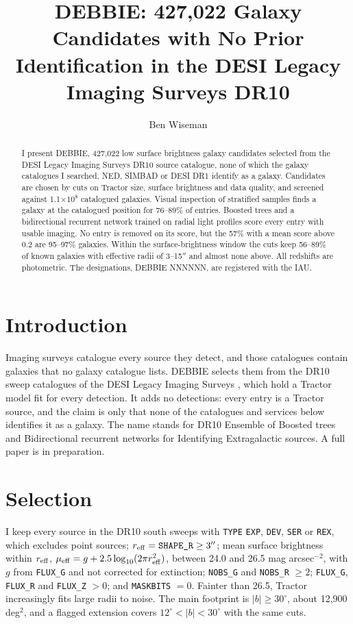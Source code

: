 \documentclass{aastex701}
\begin{document}
\title{DEBBIE: 427,022 Galaxy Candidates with No Prior Identification in the DESI Legacy Imaging Surveys DR10}

\author{Ben Wiseman}

\begin{abstract}
I present DEBBIE, 427,022 low surface brightness galaxy candidates selected from
the DESI Legacy Imaging Surveys DR10 source catalogue, none of which the galaxy
catalogues I searched, NED, SIMBAD or DESI DR1 identify as a galaxy. Candidates are chosen
by cuts on Tractor size, surface brightness and data quality, and screened
against 1.1$\times10^{8}$ catalogued galaxies. Visual inspection of
stratified samples finds a galaxy at the catalogued position for
76--89\% of entries. Boosted trees and a bidirectional recurrent
network trained on radial light profiles score every entry with usable imaging.
No entry is removed on its score, but the 57\% with a mean score above 0.2 are
95--97\% galaxies. Within the surface-brightness window the
cuts keep 56--89\% of known galaxies with effective radii of
3--15$''$ and almost none above. All redshifts are photometric. The
designations, DEBBIE NNNNNN, are registered with the IAU.
\end{abstract}

\section{Introduction}

Imaging surveys catalogue every source they detect, and those catalogues
contain galaxies that no galaxy catalogue lists. DEBBIE selects them from the
DR10 sweep catalogues of the DESI Legacy Imaging Surveys \citep{dey2019}, which
hold a Tractor model fit \citep{lang2016} for every detection. It adds no
detections: every entry is a Tractor source, and the claim is only that none of
the catalogues and services below identifies it as a galaxy. The name
stands for DR10 Ensemble of Boosted trees and Bidirectional recurrent networks
for Identifying Extragalactic sources. A full paper is in preparation.

\section{Selection}

I keep every source in the DR10 south sweeps with \texttt{TYPE} \texttt{EXP},
\texttt{DEV}, \texttt{SER} or \texttt{REX}, which excludes point sources;
$r_{\rm eff} = \texttt{SHAPE\_R} \ge 3''$; mean surface brightness within
$r_{\rm eff}$, $\mu_{\rm eff} = g + 2.5\log_{10}(2\pi r_{\rm eff}^2)$, between
24.0 and 26.5 mag arcsec$^{-2}$, with $g$ from \texttt{FLUX\_G} and not corrected
for extinction; \texttt{NOBS\_G} and \texttt{NOBS\_R} $\ge 2$; \texttt{FLUX\_G},
\texttt{FLUX\_R} and \texttt{FLUX\_Z} $> 0$; and \texttt{MASKBITS} $= 0$. Fainter
than 26.5, Tractor increasingly fits large radii to noise. The main footprint is
$|b| \ge 30^\circ$, about 12,900 deg$^2$, and a flagged extension covers
$12^\circ < |b| < 30^\circ$ with the same cuts.
\end{document}
